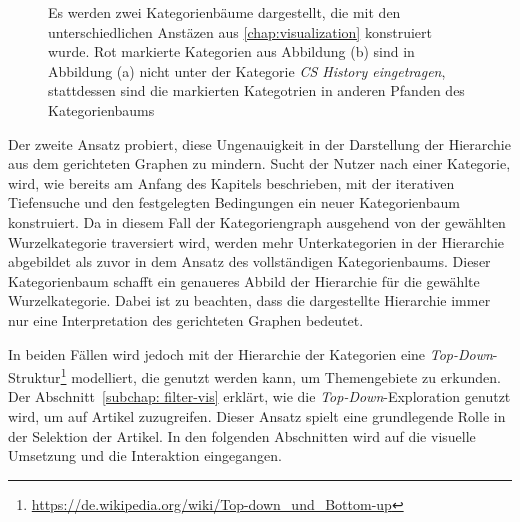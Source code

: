 \begin{figure}
\begin{tikzpicture}
    \end{tikzpicture}
    \caption{Es werden zwei Kategorienbäume dargestellt, die mit den unterschiedlichen Anstäzen aus \ref{chap:visualization} konstruiert wurde. Rot markierte Kategorien aus Abbildung (b) sind in Abbildung (a) nicht unter der Kategorie \emph{CS History eingetragen}, stattdessen sind die markierten Kategotrien in anderen Pfanden des Kategorienbaums}
    \label{fig:two-trees}
\end{figure}

Der zweite Ansatz probiert, diese Ungenauigkeit in der Darstellung der Hierarchie aus dem gerichteten Graphen zu mindern.
Sucht der Nutzer nach einer Kategorie, wird, wie bereits am Anfang des Kapitels beschrieben, mit der iterativen Tiefensuche und den festgelegten Bedingungen ein neuer Kategorienbaum konstruiert.
Da in diesem Fall der Kategoriengraph ausgehend von der gewählten Wurzelkategorie traversiert wird, werden mehr Unterkategorien in der Hierarchie abgebildet als zuvor in dem Ansatz des vollständigen Kategorienbaums.
Dieser Kategorienbaum schafft ein genaueres Abbild der Hierarchie für die gewählte Wurzelkategorie.
Dabei ist zu beachten, dass die dargestellte Hierarchie immer nur eine Interpretation des gerichteten Graphen bedeutet.

In beiden Fällen wird jedoch mit der Hierarchie der Kategorien eine \emph{Top-Down}-Struktur\footnote{\url{https://de.wikipedia.org/wiki/Top-down_und_Bottom-up}} modelliert, die genutzt werden kann, um Themengebiete zu erkunden.
Der Abschnitt~\ref{subchap: filter-vis} erklärt, wie die \emph{Top-Down}-Exploration genutzt wird, um auf Artikel zuzugreifen.
Dieser Ansatz spielt eine grundlegende Rolle in der Selektion der Artikel.
In den folgenden Abschnitten wird auf die visuelle Umsetzung und die Interaktion eingegangen.

